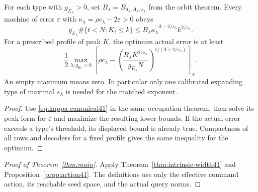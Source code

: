 \begin{corollary}\label{cor:error41}
For each type with $g_{E_\lambda}>0$, set
$B_\lambda=B_{d_\lambda,A_\lambda,s_\lambda}$ from the orbit theorem.
Every machine of error $\varepsilon$ with
$\kappa_\lambda=\rho c_\lambda-2\varepsilon>0$ obeys
\[
 g_{E_\lambda}\#\{t<N:K_t\le k\}
 \le B_\lambda\kappa_\lambda^{-3-2/s_\lambda}k^{2/s_\lambda}.
\]
For a prescribed profile of peak $K$, the optimum actual error is at least
\begin{equation}\label{eq:error41}
 \frac12\max_{\lambda:g_{E_\lambda}>0}
 \left[\rho c_\lambda-
 \left(\frac{B_\lambda K^{2/s_\lambda}}
 {g_{E_\lambda}N}\right)^{1/(3+2/s_\lambda)}\right]_+.
\end{equation}
An empty maximum means zero. In particular only one calibrated expanding
type of maximal $s_\lambda$ is needed for the matched exponent.
\end{corollary}
\begin{proof}
Use \eqref{eq:kappa-canonical41} in the same occupation theorem, then
solve its peak form for $\varepsilon$ and maximize the resulting lower
bounds. If the actual error exceeds a type's threshold, its displayed
bound is already true. Compactness of all rows and decoders for a fixed
profile gives the same inequality for the optimum.
\end{proof}

\begin{proof}[Proof of Theorem~\ref{thm:main}]
Apply Theorem~\ref{thm:intrinsic-width41} and
Proposition~\ref{prop:action41}. The definitions use only the effective
command action, its reachable seed space, and the actual query norms.
\end{proof}
